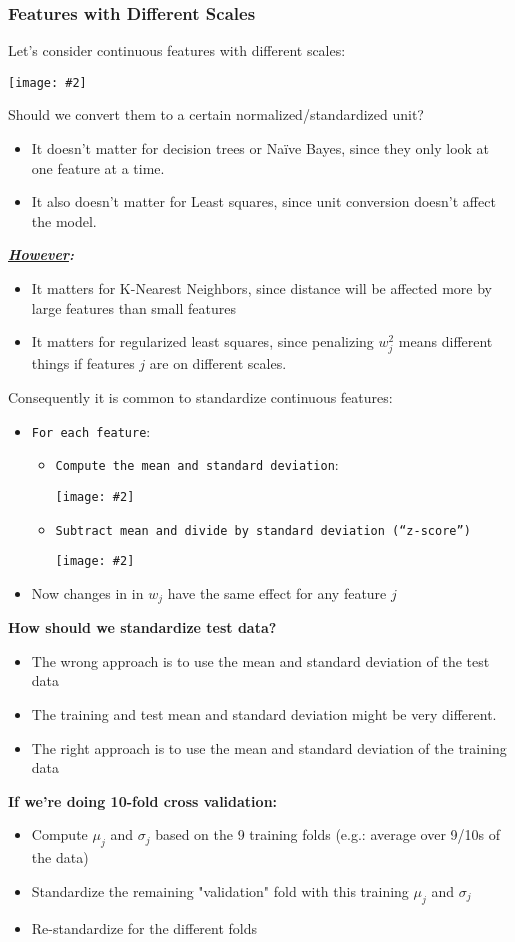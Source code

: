 \documentclass{article}
\def\blu#1{{\color{blu}#1}}
\def\gre#1{{\color{gre}#1}}
\def\red#1{{\color{red}#1}}
\newcommand{\centerfig}[2]{\begin{center}\texttt{[image: \#2]}\end{center}}
\begin{document}
\subsubsection*{Features with Different Scales}
Let's consider continuous features with different scales:
\centerfig{0.6}{diff-scales-1}
Should we convert them to a certain normalized/standardized unit?
\begin{itemize}
	\item It \gre{doesn't matter for decision trees or Naïve Bayes}, since they only look at one feature at a time.
	\item It also \gre{doesn't matter for Least squares}, since unit conversion doesn't affect the model. 
\end{itemize}
\textbf{\textit{\underline{However}:}}
\begin{itemize}
	\item It \red{matters for K-Nearest Neighbors}, since distance will be affected more by large features than small features
	\item It \red{matters for regularized least squares}, since penalizing $ w_j^2 $ means different things if features $ j $ are on different scales.
\end{itemize}
Consequently it is common to \blu{standardize continuous features}:
\begin{itemize}
	\item \texttt{For each feature}:
	\begin{itemize}
		\item \texttt{Compute the mean and standard deviation}:
		\centerfig{0.5}{stand-1}
		\item \texttt{Subtract mean and divide by standard deviation (“z-score”)}
				\centerfig{0.5}{stand-2}
	\end{itemize}
\item Now changes in in $ w_j $ have the same effect for any feature $ j $
\end{itemize}
\textbf{How should we standardize test data?}
\begin{itemize}
	\item \red{The wrong approach is} to use the mean and standard deviation of the test data
	\item The training and test mean and standard deviation might be very different. 
	\item The \gre{right approach is to use the mean and standard deviation of the training data}
\end{itemize}
\textbf{If we're doing 10-fold cross validation:}
\begin{itemize}
	\item Compute $ \mu_j $ and $ \sigma_j $ based on the 9 training folds (e.g.: average over 9/10s of the data)
	\item Standardize the remaining "validation" fold with this training $ \mu_j $ and $ \sigma_j $
	\item Re-standardize for the different folds
\end{itemize}
\end{document}
